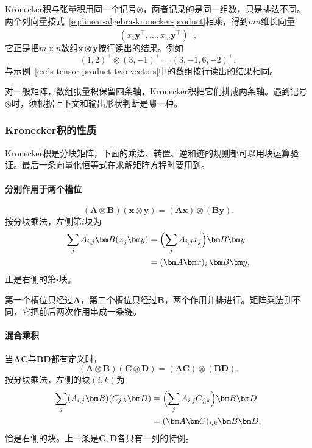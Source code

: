 Kronecker积与张量积用同一个记号$\otimes$，两者记录的是同一组数，只是排法不同。两个列向量按式~\eqref{eq:linear-algebra-kronecker-product}相乘，得到$mn$维长向量
\[
 (x_1\bm y^\top,\ldots,x_m\bm y^\top)^\top,
\]
它正是把$m\times n$数组$\bm x\otimes\bm y$按行读出的结果。例如
\[
 (1,2)^\top\otimes(3,-1)^\top=(3,-1,6,-2)^\top,
\]
与示例~\ref{ex:ls-tensor-product-two-vectors}中的数组按行读出的结果相同。

对一般矩阵，数组张量积保留四条轴，Kronecker积把它们排成两条轴。遇到记号$\otimes$时，须根据上下文和输出形状判断是哪一种。

\subsubsection{Kronecker积的性质}
\label{sec:ls-kronecker-products}

Kronecker积是分块矩阵，下面的乘法、转置、逆和迹的规则都可以用块运算验证。最后一条向量化恒等式在求解矩阵方程时要用到。

\paragraph{分别作用于两个槽位}
\[
 (\bm A\otimes\bm B)(\bm x\otimes\bm y)=(\bm A\bm x)\otimes(\bm B\bm y).
\]
按分块乘法，左侧第$i$块为
\[
 \begin{aligned}
 \sum_jA_{i,j}\bm B(x_j\bm y)
 &=\Bigl(\sum_jA_{i,j}x_j\Bigr)\bm B\bm y\\
 &=(\bm A\bm x)_i\,\bm B\bm y,
 \end{aligned}
\]
正是右侧的第$i$块。

第一个槽位只经过$\bm A$，第二个槽位只经过$\bm B$，两个作用并排进行。矩阵乘法则不同，它把前后两次作用串成一条链。

\paragraph{混合乘积}
当$\bm A\bm C$与$\bm B\bm D$都有定义时，
\begin{equation}
 (\bm A\otimes\bm B)(\bm C\otimes\bm D)
 =(\bm A\bm C)\otimes(\bm B\bm D).
 \label{eq:matrix-analysis-kronecker-mixed-product}
\end{equation}
按分块乘法，左侧的块$(i,k)$为
\[
 \begin{aligned}
 \sum_j(A_{i,j}\bm B)(C_{j,k}\bm D)
 &=\Bigl(\sum_jA_{i,j}C_{j,k}\Bigr)\bm B\bm D\\
 &=(\bm A\bm C)_{i,k}\bm B\bm D,
 \end{aligned}
\]
恰是右侧的块。上一条是$\bm C,\bm D$各只有一列的特例。

